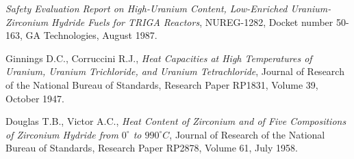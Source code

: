 \documentclass[11pt,letterpaper,titlepage]{article}
\begin{document}
\newpage
{}
\begin{thebibliography}{1}

	 {\em Safety Evaluation Report on High-Uranium Content, Low-Enriched Uranium-Zirconium Hydride Fuels for TRIGA Reactors}, NUREG-1282, Docket number 50-163, GA Technologies, August 1987.
	
	 Ginnings D.C., Corruccini R.J., {\em Heat Capacities at High Temperatures of Uranium, Uranium Trichloride, and Uranium Tetrachloride}, Journal of Research of the National Bureau of Standards, Research Paper RP1831, Volume 39, October 1947.
	
	 Douglas T.B., Victor A.C., {\em Heat Content of Zirconium and of Five Compositions of Zirconium Hydride from $0^{\circ}$ to $990^{\circ}C$}, Journal of Research of the National Bureau of Standards, Research Paper RP2878, Volume 61, July 1958.
	
\end{thebibliography}
\end{document}
